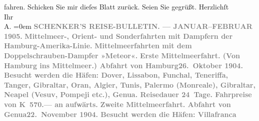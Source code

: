 \begin{ledgroupsized}[t]{13cm}
               fahren.\pend
           \pstart
           Schicken Sie mir dieſes Blatt zurück. Seien Sie gegrüßt.\pend
           \pstart
           Herzlichſt{\\[\baselineskip]}Ihr{\\[\baselineskip]}\spacefill\mbox{A.}\pend
           \leftskip=0em{}{\bigskip}\pstart
           \noindent{}\centering{}{\pb}\textcolor{gray}{\textbf{SCHENKER’S REISE-BULLETIN. — JANUAR–FEBRUAR 1905.}}\pend
           \pstart
           \noindent{}\centering{}\textcolor{gray}{\textbf{Mittelmeer-, Orient- und Sonderfahrten mit
                  Dampfern der Hamburg-Amerika-Linie.}}\pend
           {\bigskip}\pstart
           \noindent{}\centering{}\textcolor{gray}{\textbf{Mittelmeerfahrten mit dem
                  Doppelschrauben-Dampfer »Meteor«.}}\pend
           \pstart
           \noindent{}\textcolor{gray}{\textbf{\textbf{Erste Mittelmeerfahrt.}
                  (Von Hamburg ins Mittelmeer.) Abfahrt von Hamburg\textbf{26. Oktober 1904}. Besucht werden die Häfen: Dover, Lissabon, Funchal, Teneriffa, Tanger, Gibraltar, Oran, Algier,
                     Tunis, Palermo (Monreale), Gibraltar, Neapel (Vesuv, Pompeji
                  etc.), Genua. Reisedauer 24 Tage. Fahrpreise von
                     \textbf{K 570.—} an aufwärts.}}\pend
           \pstart
           \textcolor{gray}{\textbf{\textbf{Zweite Mittelmeerfahrt.}
                  Abfahrt von Genua\textbf{22. November 1904}. Besucht werden die Häfen: Villafranca
}}
\end{ledgroupsized}
